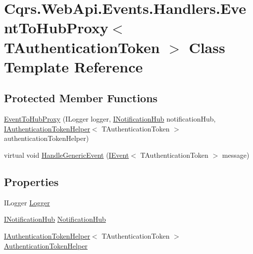 \hypertarget{classCqrs_1_1WebApi_1_1Events_1_1Handlers_1_1EventToHubProxy}{}\section{Cqrs.\+Web\+Api.\+Events.\+Handlers.\+Event\+To\+Hub\+Proxy$<$ T\+Authentication\+Token $>$ Class Template Reference}
\label{classCqrs_1_1WebApi_1_1Events_1_1Handlers_1_1EventToHubProxy}
\subsection*{Protected Member Functions}
\begin{DoxyCompactItemize}
\item 
\hyperlink{classCqrs_1_1WebApi_1_1Events_1_1Handlers_1_1EventToHubProxy_a11ce35ab8f01b97b95b757e246c9cdcd}{Event\+To\+Hub\+Proxy} (I\+Logger logger, \hyperlink{interfaceCqrs_1_1WebApi_1_1SignalR_1_1Hubs_1_1INotificationHub}{I\+Notification\+Hub} notification\+Hub, \hyperlink{interfaceCqrs_1_1Authentication_1_1IAuthenticationTokenHelper}{I\+Authentication\+Token\+Helper}$<$ T\+Authentication\+Token $>$ authentication\+Token\+Helper)
\item 
virtual void \hyperlink{classCqrs_1_1WebApi_1_1Events_1_1Handlers_1_1EventToHubProxy_a310fc8d40bfbe514406716150f30b74d}{Handle\+Generic\+Event} (\hyperlink{interfaceCqrs_1_1Events_1_1IEvent}{I\+Event}$<$ T\+Authentication\+Token $>$ message)
\end{DoxyCompactItemize}
\subsection*{Properties}
\begin{DoxyCompactItemize}
\item 
I\+Logger \hyperlink{classCqrs_1_1WebApi_1_1Events_1_1Handlers_1_1EventToHubProxy_a120e7cd3ad97d9e6382df657b9c98c4c}{Logger}
\item 
\hyperlink{interfaceCqrs_1_1WebApi_1_1SignalR_1_1Hubs_1_1INotificationHub}{I\+Notification\+Hub} \hyperlink{classCqrs_1_1WebApi_1_1Events_1_1Handlers_1_1EventToHubProxy_a3e27dc5fb1315bc8200487fbf9b3b47f}{Notification\+Hub}
\item 
\hyperlink{interfaceCqrs_1_1Authentication_1_1IAuthenticationTokenHelper}{I\+Authentication\+Token\+Helper}$<$ T\+Authentication\+Token $>$ \hyperlink{classCqrs_1_1WebApi_1_1Events_1_1Handlers_1_1EventToHubProxy_af5593d8e6bace37fa52545c1f8e65e32}{Authentication\+Token\+Helper}
\end{DoxyCompactItemize}


